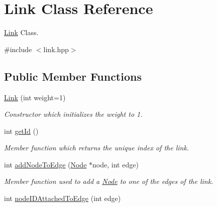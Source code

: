 \hypertarget{classLink}{\section{Link Class Reference}
\label{classLink}
}


\hyperlink{classLink}{Link} Class.  




{\ttfamily \#include $<$link.\-hpp$>$}

\subsection*{Public Member Functions}
\begin{DoxyCompactItemize}
\item 
\hypertarget{classLink_a7d1f0fba2d522bae401cac8602820cce}{\hyperlink{classLink_a7d1f0fba2d522bae401cac8602820cce}{Link} (int weight=1)}\label{classLink_a7d1f0fba2d522bae401cac8602820cce}

\begin{DoxyCompactList}\small\item\em Constructor which initializes the weight to 1. \end{DoxyCompactList}\item 
\hypertarget{classLink_aac6fc336b263d742d2d72ccc28b8d34a}{int \hyperlink{classLink_aac6fc336b263d742d2d72ccc28b8d34a}{get\-Id} ()}\label{classLink_aac6fc336b263d742d2d72ccc28b8d34a}

\begin{DoxyCompactList}\small\item\em Member function which returns the unique index of the link. \end{DoxyCompactList}\item 
\hypertarget{classLink_aef6e5d265556b37090bb59e1bc842ede}{int \hyperlink{classLink_aef6e5d265556b37090bb59e1bc842ede}{add\-Node\-To\-Edge} (\hyperlink{classNode}{Node} $\ast$node, int edge)}\label{classLink_aef6e5d265556b37090bb59e1bc842ede}

\begin{DoxyCompactList}\small\item\em Member function used to add a \hyperlink{classNode}{Node} to one of the edges of the link. \end{DoxyCompactList}\item 
\hypertarget{classLink_ae70cfdb53e4e84f74fccf32672bba0ff}{int \hyperlink{classLink_ae70cfdb53e4e84f74fccf32672bba0ff}{node\-I\-D\-Attached\-To\-Edge} (int edge)}\label{classLink_ae70cfdb53e4e84f74fccf32672bba0ff}


\end{DoxyCompactItemize}
